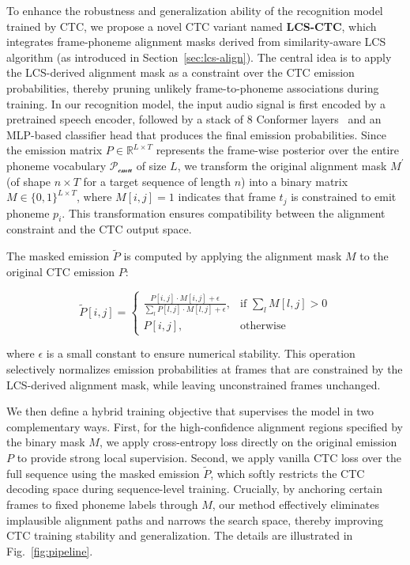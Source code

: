 To enhance the robustness and generalization ability of the recognition model trained by CTC, we propose a novel CTC variant named \textbf{LCS-CTC}, which integrates frame-phoneme alignment masks derived from similarity-aware LCS algorithm (as introduced in Section~\ref{sec:lcs-align}). The central idea is to apply the LCS-derived alignment mask as a constraint over the CTC emission probabilities, thereby pruning unlikely frame-to-phoneme associations during training. In our recognition model, the input audio signal is first encoded by a pretrained speech encoder, followed by a stack of 8 Conformer layers~\cite{gulati2020conformer} and an MLP-based classifier head that produces the final emission probabilities. Since the emission matrix $P \in \mathbb{R}^{L \times T}$ represents the frame-wise posterior over the entire phoneme vocabulary $\mathcal{P_\text{cmu}}$ of size $L$, we transform the original alignment mask $M^{'}$(of shape $n \times T$ for a target sequence of length $n$) into a binary matrix $M \in \{0,1\}^{L \times T}$, where $M[i,j] = 1$ indicates that frame $t_j$ is constrained to emit phoneme $p_i$. This transformation ensures compatibility between the alignment constraint and the CTC output space.

The masked emission $\tilde{P}$ is computed by applying the alignment mask $M$ to the original CTC emission $P$:


\begin{equation*}
\tilde{P}[i,j] =
\begin{cases}
\displaystyle\frac{P[i,j] \cdot M[i,j] + \epsilon}{\sum_{l} P[l,j] \cdot M[l,j] + \epsilon}, & \text{if } \sum_{l} M[l,j] > 0 \\
P[i,j], & \text{otherwise}
\end{cases}
\end{equation*}


where $\epsilon$ is a small constant to ensure numerical stability. This operation selectively normalizes emission probabilities at frames that are constrained by the LCS-derived alignment mask, while leaving unconstrained frames unchanged. 

We then define a hybrid training objective that supervises the model in two complementary ways. First, for the high-confidence alignment regions specified by the binary mask $M$, we apply cross-entropy loss directly on the original emission $P$ to provide strong local supervision. Second, we apply vanilla CTC loss over the full sequence using the masked emission $\tilde{P}$, which softly restricts the CTC decoding space during sequence-level training. Crucially, by anchoring certain frames to fixed phoneme labels through $M$, our method effectively eliminates implausible alignment paths and narrows the search space, thereby improving CTC training stability and generalization. The details are illustrated in Fig.~\ref{fig:pipeline}.


